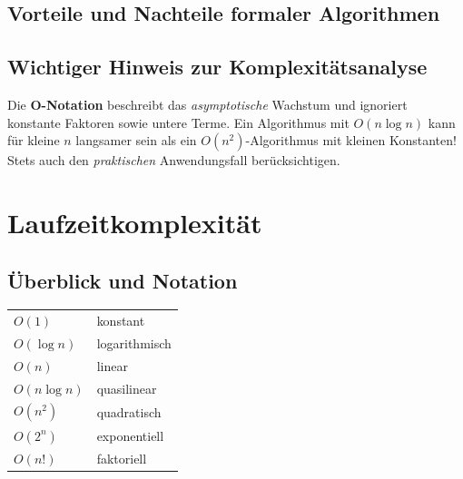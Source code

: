 \subsection{Vorteile und Nachteile formaler Algorithmen}

\begin{procon}
\end{procon}

\subsection{Wichtiger Hinweis zur Komplexitätsanalyse}

\begin{warnbox}
Die \textbf{O-Notation} beschreibt das \emph{asymptotische} Wachstum und
ignoriert konstante Faktoren sowie untere Terme.
Ein Algorithmus mit $O(n \log n)$ kann für kleine $n$ langsamer sein als
ein $O(n^2)$-Algorithmus mit kleinen Konstanten!
Stets auch den \emph{praktischen} Anwendungsfall berücksichtigen.
\end{warnbox}

\section{Laufzeitkomplexität}

\subsection{Überblick und Notation}

\begin{infobox}
\begin{tabular}{@{}ll@{}}
  $O(1)$        & konstant           \\
  $O(\log n)$   & logarithmisch      \\
  $O(n)$        & linear             \\
  $O(n \log n)$ & quasilinear        \\
  $O(n^2)$      & quadratisch        \\
  $O(2^n)$      & exponentiell       \\
  $O(n!)$       & faktoriell         \\
\end{tabular}
\end{infobox}

